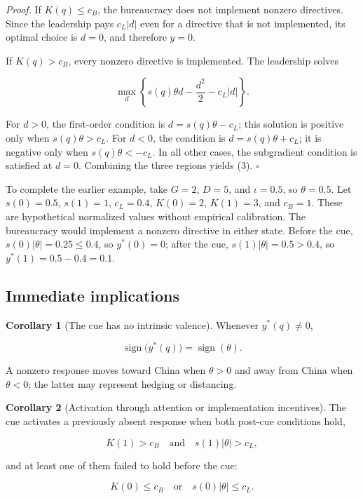 \documentclass[
  11pt,
]{article}
\theoremstyle{definition}
\newtheorem{corollary}{Corollary}
\begin{document}
\textit{Proof.} If \(K(q)\leq c_B\), the bureaucracy does not implement
nonzero directives. Since the leadership pays \(c_L|d|\) even for a
directive that is not implemented, its optimal choice is \(d=0\), and
therefore \(y=0\).

\begin{minipage}{\linewidth}
If $K(q)>c_B$, every nonzero directive is implemented. The leadership solves

\[
\max_d\left\{s(q)\theta d-\frac{d^2}{2}-c_L|d|\right\}.
\]
\end{minipage}

For \(d>0\), the first-order condition is \(d=s(q)\theta-c_L\); this
solution is positive only when \(s(q)\theta>c_L\). For \(d<0\), the
condition is \(d=s(q)\theta+c_L\); it is negative only when
\(s(q)\theta<-c_L\). In all other cases, the subgradient condition is
satisfied at \(d=0\). Combining the three regions yields (3).
\(\square\)

To complete the earlier example, take \(G=2\), \(D=5\), and
\(\iota=0.5\), so \(\theta=0.5\). Let \(s(0)=0.5\), \(s(1)=1\),
\(c_L=0.4\), \(K(0)=2\), \(K(1)=3\), and \(c_B=1\). These are
hypothetical normalized values without empirical calibration. The
bureaucracy would implement a nonzero directive in either state. Before
the cue, \(s(0)|\theta|=0.25\leq0.4\), so \(y^*(0)=0\); after the cue,
\(s(1)|\theta|=0.5>0.4\), so \(y^*(1)=0.5-0.4=0.1\).

\subsection{Immediate implications}\label{immediate-implications}

\begin{corollary}[The cue has no intrinsic valence]
Whenever $y^*(q)\neq0$,

\[
\operatorname{sign}\bigl(y^*(q)\bigr)=\operatorname{sign}(\theta).
\]

A nonzero response moves toward China when $\theta>0$ and away from China when $\theta<0$; the latter may represent hedging or distancing.
\end{corollary}

\begin{corollary}[Activation through attention or implementation incentives]
The cue activates a previously absent response when both post-cue conditions hold,

\[
K(1)>c_B
\quad\text{and}\quad
s(1)|\theta|>c_L,
\]

and at least one of them failed to hold before the cue:

\[
K(0)\leq c_B
\quad\text{or}\quad
s(0)|\theta|\leq c_L.
\]
\end{corollary}
\end{document}
